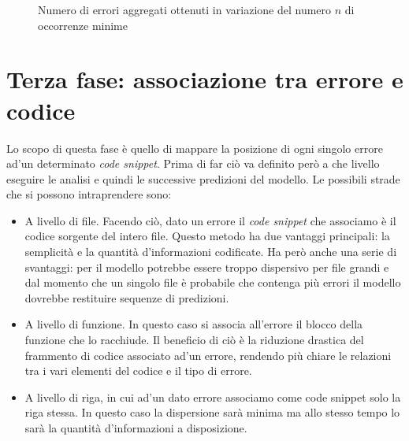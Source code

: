 \begin{figure}[h]
    \centering
    \caption{Numero di errori aggregati ottenuti in variazione del numero $n$ di occorrenze minime}
    \label{fig:grafo_aggregazione}
\end{figure}

\section{Terza fase: associazione tra errore e codice}
Lo scopo di questa fase è quello di mappare la posizione di ogni singolo errore ad'un determinato \textit{code snippet}. 
Prima di far ciò va definito però a che livello eseguire le analisi e quindi le successive predizioni del modello.
Le possibili strade che si possono intraprendere sono:
  \begin{itemize}
    \item A livello di file. Facendo ciò, dato un errore il \textit{code snippet} che associamo è il codice sorgente del intero file. 
          Questo metodo ha due vantaggi principali: la semplicità e la quantità d'informazioni codificate. 
          Ha però anche una serie di svantaggi: per il modello potrebbe essere troppo dispersivo per file grandi e dal momento che un singolo file è probabile che contenga più errori il modello dovrebbe restituire sequenze di predizioni.
    \item A livello di funzione. In questo caso si associa all'errore il blocco della funzione che lo racchiude.
          Il beneficio di ciò è la riduzione drastica del frammento di codice associato ad'un errore, rendendo più chiare le relazioni tra i vari elementi del codice e il tipo di errore.
    \item A livello di riga, in cui ad'un dato errore associamo come code snippet solo la riga stessa. In questo caso la dispersione sarà minima ma allo stesso tempo lo sarà la quantità d'informazioni a disposizione.
  \end{itemize}

